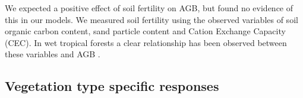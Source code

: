 \documentclass[11pt,a4paper]{article}
\begin{document}
We expected a positive effect of soil fertility on AGB, but found no evidence of this in our models. We measured soil fertility using the observed variables of soil organic carbon content, sand particle content and Cation Exchange Capacity (CEC). In wet tropical forests a clear relationship has been observed between these variables and AGB \citep{Slik2010, MORE}. 


\subsection*{Vegetation type specific responses}

\end{document}
